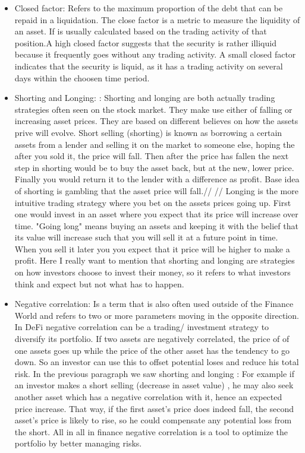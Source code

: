 \documentclass{article}
\begin{document}
\begin{itemize}
\item {Closed factor}: Refers to the maximum proportion of the debt that can be repaid in a liquidation. The close factor is a metric to measure the liquidity of an asset. If is usually calculated based on the trading activity of that position.A high closed factor suggests that the security is rather illiquid because it frequently goes without any trading activity. A small closed factor indicates that the security is liquid, as it has a trading activity on several days within the choosen time period.

\item {Shorting and Longing: }: Shorting and longing are both actually trading strategies often seen on the stock market. They make use either of falling or increasing asset prices. They are based on different believes on how the assets prive will evolve. Short selling (shorting) is known as borrowing a certain assets from a lender and selling it on the market to someone else, hoping the after you sold it, the price will fall. Then after the price has fallen the next step in shorting would be to buy the asset back, but at the new, lower price. Finally you would return it to the lender with a difference as profit. Base idea of shorting is gambling that the asset price will fall.//
//
Longing is the more intuitive trading strategy where you bet on the assets prices going up. First one would invest in an asset where you expect that its price will increase over time. "Going long" means buying an assets and keeping it with the belief that its value will increase such that you will sell it at a future point in time. When you sell it later you you expect that it price will be higher to make a profit. Here I really want to mention that shorting and longing are strategies on how investors choose to invest their money, so it refers to what investors think and expect but not what has to happen.

\item {Negative correlation}: Is a term that is also often used outside of the Finance World and refers to two or more parameters moving in the opposite direction. In DeFi negative correlation can be a trading/ investment strategy to diversify its portfolio. If two assets are negatively correlated, the price of of one assets goes up while the price of the other asset has the tendency to go down. So an investor can use this to offset potential loses and reduce his total risk. In the previous paragraph we saw shorting and longing : For example if an investor makes a short selling (decrease in asset value) , he may also seek another asset which has a negative correlation with it, hence an expected price increase. That way, if the first asset's price does indeed fall, the second asset's price is likely to rise, so he could compensate any potential loss from the short. All in all in finance negative correlation is a tool to optimize the portfolio by better managing risks.



\end{itemize}
\end{document}
